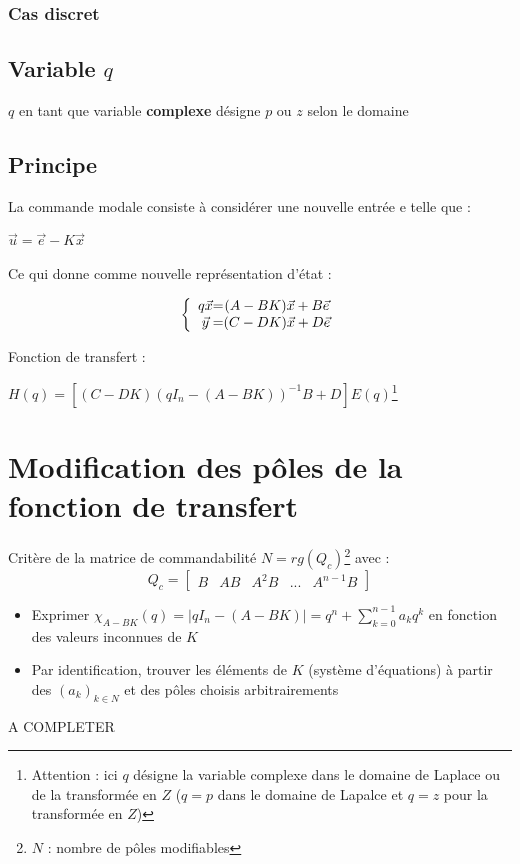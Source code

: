 {{{\subsubsection{Cas discret}
\begin{center}
    \Large{}
\end{center}
\subsection{Variable $q$}
\large{$q$ en tant que variable \textbf{complexe} désigne $p$ ou $z$ selon le domaine}
\subsection{Principe}
\large{La commande modale consiste à considérer une nouvelle entrée e telle que :}
\begin{center}
    \Large{$
    \vec{u} = \vec{e} - K\vec{x}
    $}
\end{center}
\large{Ce qui donne comme nouvelle représentation d'état : }
\begin{center}
    \Large{
    \[
        \left \{
        \begin{array}{c @{=} c}
            q\vec{x} & (A - BK)\vec{x} + B\vec{e}\\
            \vec{y} & (C - DK)\vec{x} + D\vec{e}
        \end{array}
        \right.
    \]
    }
\end{center}
\large{Fonction de transfert : }
\begin{center}
    \Large{$
    H(q) = [(C - DK)(qI_{n} - (A - BK))^{-1}B + D]E(q)
    $}\footnote{Attention : ici $q$ désigne la variable complexe dans le domaine de Laplace ou de la transformée en $Z$ ($q = p$ dans le domaine de Lapalce et $q = z$ pour la transformée en $Z$)}
\end{center}
\newpage
\section{Modification des pôles de la fonction de transfert}
\large{Critère de la matrice de commandabilité}
$N = rg(Q_{c})$\footnote{$N$ : nombre de pôles modifiables} avec :
\[
Q_{c} = 
\begin{bmatrix}
    B & AB & A^{2}B & ... & A^{n-1}B
\end{bmatrix}
\]

\begin{itemize}
    \item Exprimer $\chi_{A - BK}(q) = |qI_{n} - (A - BK)| = q^{n} + \sum_{k=0}^{n-1}{a_{k}q^{k}}$ en fonction des valeurs inconnues de $K$
    \item Par identification, trouver les éléments de $K$ (système d'équations) à partir des $(a_{k})_{k \in N}$ et des pôles choisis arbitrairements
\end{itemize}
A COMPLETER
\newpage
}}}
